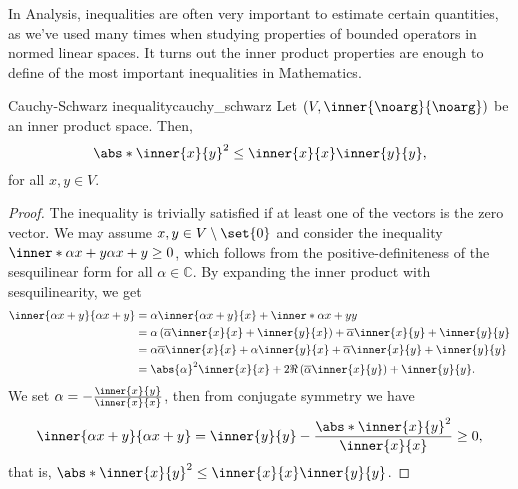 In Analysis, inequalities are often very important to estimate certain quantities, as we've used many times when studying properties of bounded operators in normed linear spaces. It turns out the inner product properties are enough to define of the most important inequalities in Mathematics.
\begin{theorem}{Cauchy-Schwarz inequality}{cauchy_schwarz}
    Let \((V, \inner{\noarg}{\noarg})\) be an inner product space. Then,
    \begin{equation*}
        \abs*{\inner{x}{y}}^2 \leq \inner{x}{x} \inner{y}{y},
    \end{equation*}
    for all \(x, y \in V\).
\end{theorem}
\begin{proof}
    The inequality is trivially satisfied if at least one of the vectors is the zero vector. We may assume \(x, y \in V\setminus\set{0}\) and consider the inequality \(\inner*{\alpha x + y}{\alpha x + y} \geq 0\), which follows from the positive-definiteness of the sesquilinear form for all \(\alpha \in \mathbb{C}\). By expanding the inner product with sesquilinearity, we get
    \begin{align*}
        \inner{\alpha x + y}{\alpha x + y} &= \alpha\inner{\alpha x + y}{x} + \inner*{\alpha x + y}{y}\\
                                           &= \alpha \left(\conj{\alpha} \inner{x}{x} + \inner{y}{x}\right) + \conj{\alpha}\inner{x}{y} + \inner{y}{y}\\
                                           &= \alpha\conj{\alpha}\inner{x}{x} + \alpha \inner{y}{x} + \conj{\alpha}\inner{x}{y} + \inner{y}{y}\\
                                           &= \abs{\alpha}^2 \inner{x}{x} + 2\Re\left(\conj{\alpha}\inner{x}{y}\right) + \inner{y}{y}.
    \end{align*}
    We set \(\alpha = - \frac{\inner{x}{y}}{\inner{x}{x}}\), then from conjugate symmetry we have
    \begin{equation*}
        \inner{\alpha x + y}{\alpha x + y} = \inner{y}{y} - \frac{\abs*{\inner{x}{y}}^2}{\inner{x}{x}} \geq 0,
    \end{equation*}
    that is, \(\abs*{\inner{x}{y}}^2 \leq \inner{x}{x} \inner{y}{y}\).
\end{proof}


